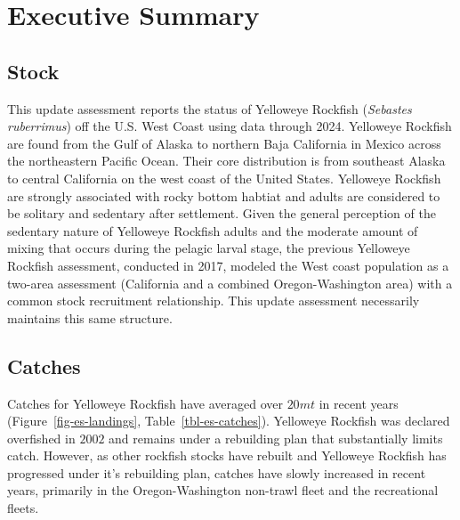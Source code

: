 \documentclass[
]{scrartcl}
\begin{document}
\newpage{}

\newpage{}

\section*{Executive Summary}\label{executive-summary}

\subsection*{Stock}\label{stock}

This update assessment reports the status of Yelloweye Rockfish
(\emph{Sebastes ruberrimus}) off the U.S. West Coast using data through
2024. Yelloweye Rockfish are found from the Gulf of Alaska to northern
Baja California in Mexico across the northeastern Pacific Ocean. Their
core distribution is from southeast Alaska to central California on the
west coast of the United States. Yelloweye Rockfish are strongly
associated with rocky bottom habtiat and adults are considered to be
solitary and sedentary after settlement. Given the general perception of
the sedentary nature of Yelloweye Rockfish adults and the moderate
amount of mixing that occurs during the pelagic larval stage, the
previous Yelloweye Rockfish assessment, conducted in 2017, modeled the
West coast population as a two-area assessment (California and a
combined Oregon-Washington area) with a common stock recruitment
relationship. This update assessment necessarily maintains this same
structure.

\subsection*{Catches}\label{catches}

Catches for Yelloweye Rockfish have averaged over \(20 mt\) in recent
years (Figure~\ref{fig-es-landings}, Table~\ref{tbl-es-catches}).
Yelloweye Rockfish was declared overfished in \(2002\) and remains under
a rebuilding plan that substantially limits catch. However, as other
rockfish stocks have rebuilt and Yelloweye Rockfish has progressed under
it's rebuilding plan, catches have slowly increased in recent years,
primarily in the Oregon-Washington non-trawl fleet and the recreational
fleets.
\end{document}
